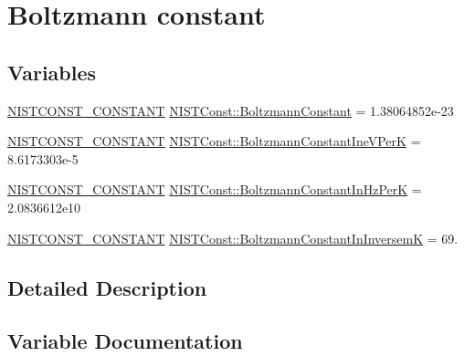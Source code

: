 \hypertarget{group___n_i_s_t_const-_boltzmann_constant}{}\section{Boltzmann constant}
\label{group___n_i_s_t_const-_boltzmann_constant}
\subsection*{Variables}
\begin{DoxyCompactItemize}
\item 
\mbox{\hyperlink{group___n_i_s_t_const-_macros_ga2b0fc1d7452373f816175dd86ce26729}{N\+I\+S\+T\+C\+O\+N\+S\+T\+\_\+\+C\+O\+N\+S\+T\+A\+NT}} \mbox{\hyperlink{group___n_i_s_t_const-_boltzmann_constant_ga9a66c4988ef0f1d8298d0f43ccea6f1f}{N\+I\+S\+T\+Const\+::\+Boltzmann\+Constant}} = 1.\+38064852e-\/23
\item 
\mbox{\hyperlink{group___n_i_s_t_const-_macros_ga2b0fc1d7452373f816175dd86ce26729}{N\+I\+S\+T\+C\+O\+N\+S\+T\+\_\+\+C\+O\+N\+S\+T\+A\+NT}} \mbox{\hyperlink{group___n_i_s_t_const-_boltzmann_constant_ga8c0cb1b4b0d54e1a5bf735efaef8d349}{N\+I\+S\+T\+Const\+::\+Boltzmann\+Constant\+Ine\+V\+PerK}} = 8.\+6173303e-\/5
\item 
\mbox{\hyperlink{group___n_i_s_t_const-_macros_ga2b0fc1d7452373f816175dd86ce26729}{N\+I\+S\+T\+C\+O\+N\+S\+T\+\_\+\+C\+O\+N\+S\+T\+A\+NT}} \mbox{\hyperlink{group___n_i_s_t_const-_boltzmann_constant_gae7c3bd9c33c056465e2fe1e8e6f5bbd2}{N\+I\+S\+T\+Const\+::\+Boltzmann\+Constant\+In\+Hz\+PerK}} = 2.\+0836612e10
\item 
\mbox{\hyperlink{group___n_i_s_t_const-_macros_ga2b0fc1d7452373f816175dd86ce26729}{N\+I\+S\+T\+C\+O\+N\+S\+T\+\_\+\+C\+O\+N\+S\+T\+A\+NT}} \mbox{\hyperlink{group___n_i_s_t_const-_boltzmann_constant_ga03a6526c1016d67e765abded43b37f36}{N\+I\+S\+T\+Const\+::\+Boltzmann\+Constant\+In\+InversemK}} = 69.
\end{DoxyCompactItemize}


\subsection{Detailed Description}


\subsection{Variable Documentation}
\mbox{\label{group___n_i_s_t_const-_boltzmann_constant_ga9a66c4988ef0f1d8298d0f43ccea6f1f}} 
